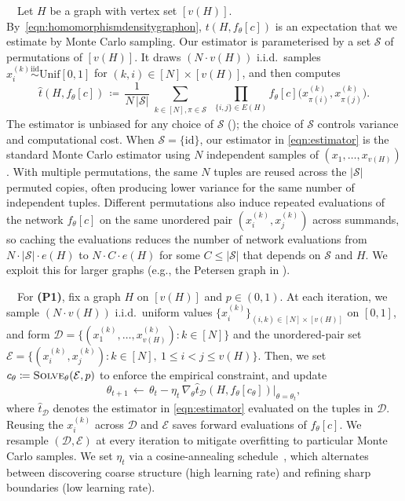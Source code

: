 \documentclass[11pt]{article}
\theoremstyle{plain}
\theoremstyle{definition}
\theoremstyle{remark}
\begin{document}
\ $\,$
Let $H$ be a graph with vertex set $[v(H)]$. By~\eqref{eqn:homomorphismdensitygraphon}, $t(H, f_\theta[c])$ is an expectation that we estimate by Monte Carlo sampling. Our estimator is parameterised by a set $\mathcal{S}$ of permutations of $[v(H)]$. It draws $(N \cdot v(H))$ i.i.d.\ samples $x_i^{(k)} \stackrel{\mathrm{iid}}{\sim} \mathrm{Unif}[0,1]$ for $(k, i) \in [N] \times [v(H)]$, and then computes
\begin{equation}
\label{eqn:estimator}
  \widehat{t}(H, f_\theta[c])
  \,\coloneqq\,
  \frac{1}{N \, |\mathcal{S}|}
  \sum_{\substack{k \in [N], \pi \in \mathcal{S}}}\,
  \prod_{\{i, j\} \in E(H)}
  f_\theta[c]\bigl(x_{\pi(i)}^{(k)}, x_{\pi(j)}^{(k)}\bigr).
\end{equation}
The estimator is unbiased for any choice of $\mathcal{S}$ (); the choice of $\mathcal{S}$ controls variance and computational cost.
When $\mathcal{S} = \{\mathrm{id}\}$, our estimator in \eqref{eqn:estimator} is the standard Monte Carlo estimator using $N$ independent samples of $(x_1, \ldots, x_{v(H)})$. With multiple permutations, the same $N$ tuples are reused across the $|\mathcal{S}|$ permuted copies, often producing lower variance for the same number of independent tuples.
Different permutations also induce repeated evaluations of the network $f_\theta[c]$ on the same unordered pair $(x_i^{(k)}, x_j^{(k)})$ across summands, so caching the evaluations reduces the number of network evaluations from $N \cdot |\mathcal{S}| \cdot e(H)$ to $N \cdot C \cdot e(H)$ for some $C \le |\mathcal{S}|$ that depends on $\mathcal{S}$ and $H$. We exploit this for larger graphs (e.g., the Petersen graph in ).

\ $\,$
For \textbf{(P1)}, fix a graph $H$ on $[v(H)]$ and $p \in (0, 1)$. At each iteration, we sample $(N \cdot v(H))$ i.i.d.\ uniform values $\{x_i^{(k)}\}_{(i,k) \in [N] \times [v(H)]}$ on $[0, 1]$, and form
$\mathcal{D} = \{(x_1^{(k)}, \ldots, x_{v(H)}^{(k)}) : k \in [N]\}$ and the unordered-pair set $\mathcal{E} = \{(x^{(k)}_i, x^{(k)}_j) : k \in [N],\ 1 \le i < j \le v(H)\}$. Then, we set $c_\theta \coloneqq \textsc{Solve}_\theta(\mathcal{E}, p)$ to enforce the empirical constraint, and update
\[
\theta_{t+1} \,\leftarrow\, \theta_t - \eta_t\, \nabla_\theta \widehat{t}_{\mathcal{D}}(H, f_\theta[c_\theta])\big|_{\theta = \theta_t},
\]
where $\widehat{t}_{\mathcal{D}}$ denotes the estimator in \eqref{eqn:estimator} evaluated on the tuples in $\mathcal{D}$. Reusing the $x_i^{(k)}$ across $\mathcal{D}$ and $\mathcal{E}$ saves forward evaluations of $f_\theta[c]$. We resample $(\mathcal{D}, \mathcal{E})$ at every iteration to mitigate overfitting to particular Monte Carlo samples.
We set $\eta_t$ via a cosine-annealing schedule~\citep{loshchilov2017sgdr}, which alternates between discovering coarse structure (high learning rate) and refining sharp boundaries (low learning rate).
\end{document}
